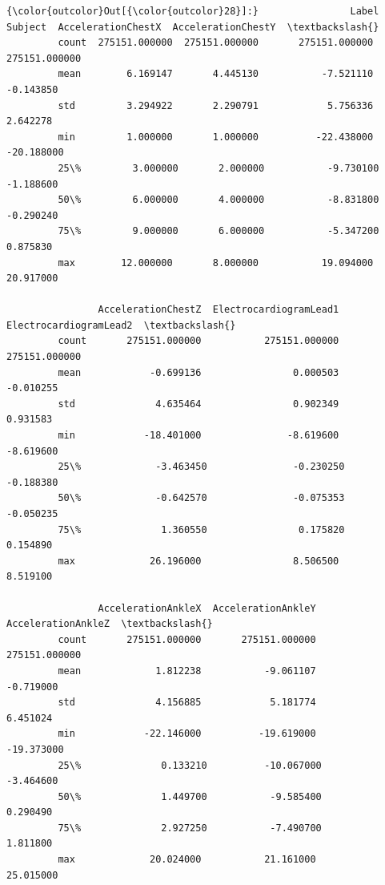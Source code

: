 \documentclass[11pt]{article}
\begin{document}
\begin{Verbatim}[commandchars=\\\{\}]
{\color{outcolor}Out[{\color{outcolor}28}]:}                Label        Subject  AccelerationChestX  AccelerationChestY  \textbackslash{}
         count  275151.000000  275151.000000       275151.000000       275151.000000   
         mean        6.169147       4.445130           -7.521110           -0.143850   
         std         3.294922       2.290791            5.756336            2.642278   
         min         1.000000       1.000000          -22.438000          -20.188000   
         25\%         3.000000       2.000000           -9.730100           -1.188600   
         50\%         6.000000       4.000000           -8.831800           -0.290240   
         75\%         9.000000       6.000000           -5.347200            0.875830   
         max        12.000000       8.000000           19.094000           20.917000   
         
                AccelerationChestZ  ElectrocardiogramLead1  ElectrocardiogramLead2  \textbackslash{}
         count       275151.000000           275151.000000           275151.000000   
         mean            -0.699136                0.000503               -0.010255   
         std              4.635464                0.902349                0.931583   
         min            -18.401000               -8.619600               -8.619600   
         25\%             -3.463450               -0.230250               -0.188380   
         50\%             -0.642570               -0.075353               -0.050235   
         75\%              1.360550                0.175820                0.154890   
         max             26.196000                8.506500                8.519100   
         
                AccelerationAnkleX  AccelerationAnkleY  AccelerationAnkleZ  \textbackslash{}
         count       275151.000000       275151.000000       275151.000000   
         mean             1.812238           -9.061107           -0.719000   
         std              4.156885            5.181774            6.451024   
         min            -22.146000          -19.619000          -19.373000   
         25\%              0.133210          -10.067000           -3.464600   
         50\%              1.449700           -9.585400            0.290490   
         75\%              2.927250           -7.490700            1.811800   
         max             20.024000           21.161000           25.015000   
         

\end{Verbatim}
\end{document}
